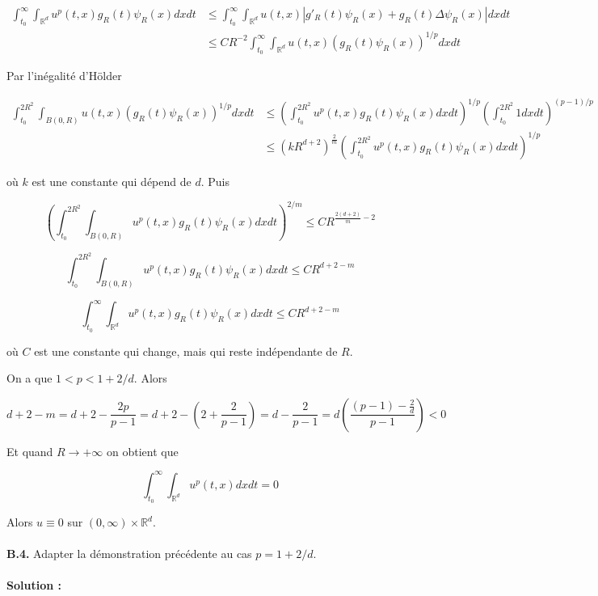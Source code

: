 \documentclass[10pt,a4paper,oneside]{article}
\begin{document}
\begin{align*}
\int_{t_0}^\infty \int_{\mathbb{R}^d} u^p(t,x) g_R(t) \psi_R(x) dx dt &\leq \int_{t_0}^\infty \int_{\mathbb{R}^d} u(t,x) |g'_R(t) \psi_R(x) + g_R(t) \Delta \psi_R(x)| dx dt \\
&\leq CR^{-2} \int_{t_0}^\infty \int_{\mathbb{R}^d} u(t,x) (g_R(t) \psi_R(x))^{1 / p} dx dt
\end{align*}

Par l'inégalité d'Hölder

\begin{align*}
\int_{t_0}^{2R^2} \int_{B(0,R)} u(t,x) (g_R(t) \psi_R(x))^{1 / p} dx dt
&\leq \left( \int_{t_0}^{2R^2} u^p(t,x) g_R(t) \psi_R(x) dx dt \right)^{1 / p} \left( \int_{t_0}^{2R^2} 1 dx dt \right)^{(p - 1) / p} \\
&\leq (kR^{d + 2})^{\frac{2}{m}} \left( \int_{t_0}^{2R^2} u^p(t,x) g_R(t) \psi_R(x) dx dt \right)^{1 / p}
\end{align*}

où $k$ est une constante qui dépend de $d$. Puis

\[ \left( \int_{t_0}^{2R^2} \int_{B(0,R)} u^p(t,x) g_R(t) \psi_R(x) dx dt \right)^{2 / m} \leq CR^{\frac{2(d + 2)}{m} - 2} \]

\[ \int_{t_0}^{2R^2} \int_{B(0,R)} u^p(t,x) g_R(t) \psi_R(x) dx dt \leq CR^{d + 2 - m} \]

\[ \boxed{ \int_{t_0}^{\infty} \int_{\mathbb{R}^d} u^p(t,x) g_R(t) \psi_R(x) dx dt \leq CR^{d + 2 - m} } \]

où $C$ est une constante qui change, mais qui reste indépendante de $R$.

On a que $1 < p < 1 + 2/d$. Alors

\[ d + 2 - m = d + 2 - \frac{2p}{p - 1} = d + 2 - (2 + \frac{2}{p - 1}) = d - \frac{2}{p - 1} = d \left( \frac{(p - 1) - \frac{2}{d}}{p - 1} \right) < 0 \]

Et quand $R \to +\infty$ on obtient que

\[ \int_{t_0}^{\infty} \int_{\mathbb{R}^d} u^p(t,x) dx dt = 0 \]

Alors $u \equiv 0$ sur $(0,\infty) \times \mathbb{R}^d$.
\\ \\
\textbf{B.4.} Adapter la démonstration précédente au cas $p = 1 + 2/d$.
\\ \\
\textbf{Solution :}
\end{document}
